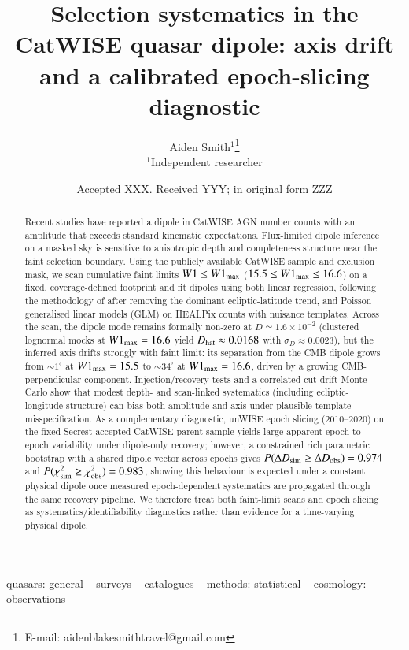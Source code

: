 \documentclass[fleqn,usenatbib]{mnras}
\title[CatWISE quasar dipole systematics]{Selection systematics in the CatWISE quasar dipole: axis drift and a calibrated epoch-slicing diagnostic}
\author[A. Smith]{
Aiden Smith$^{1}$\thanks{E-mail: aidenblakesmithtravel@gmail.com} \\
$^{1}$Independent researcher
}
\date{Accepted XXX. Received YYY; in original form ZZZ}
\begin{document}
\label{firstpage}
\pagerange{\pageref{firstpage}--\pageref{LastPage}}
\maketitle

\begin{abstract}
Recent studies have reported a dipole in CatWISE AGN number counts with an amplitude that exceeds standard kinematic expectations.
Flux-limited dipole inference on a masked sky is sensitive to anisotropic depth and completeness structure near the faint selection boundary.
Using the publicly available CatWISE sample and exclusion mask, we scan cumulative faint limits $W1 \le W1_{\rm max}$ ($15.5 \le W1_{\rm max} \le 16.6$) on a fixed, coverage-defined footprint and fit dipoles using both linear regression, following the methodology of \citet{secrest2022} after removing the dominant ecliptic-latitude trend, and Poisson generalised linear models (GLM) on HEALPix counts with nuisance templates.
Across the scan, the dipole mode remains formally non-zero at $D\simeq1.6\times10^{-2}$ (clustered lognormal mocks at $W1_{\rm max}=16.6$ yield $D_{\rm hat}\approx0.0168$ with $\sigma_D\approx0.0023$), but the inferred axis drifts strongly with faint limit: its separation from the CMB dipole grows from $\sim1^\circ$ at $W1_{\rm max}=15.5$ to $\sim34^\circ$ at $W1_{\rm max}=16.6$, driven by a growing CMB-perpendicular component.
Injection/recovery tests and a correlated-cut drift Monte Carlo show that modest depth- and scan-linked systematics (including ecliptic-longitude structure) can bias both amplitude and axis under plausible template misspecification.
As a complementary diagnostic, unWISE epoch slicing (2010--2020) on the fixed Secrest-accepted CatWISE parent sample yields large apparent epoch-to-epoch variability under dipole-only recovery; however, a constrained rich parametric bootstrap with a shared dipole vector across epochs gives $P(\Delta D_{\rm sim}\ge\Delta D_{\rm obs})=0.974$ and $P(\chi^2_{\rm sim}\ge\chi^2_{\rm obs})=0.983$, showing this behaviour is expected under a constant physical dipole once measured epoch-dependent systematics are propagated through the same recovery pipeline.
We therefore treat both faint-limit scans and epoch slicing as systematics/identifiability diagnostics rather than evidence for a time-varying physical dipole.
\end{abstract}

\begin{keywords}
quasars: general -- surveys -- catalogues -- methods: statistical -- cosmology: observations
\end{keywords}
\end{document}
